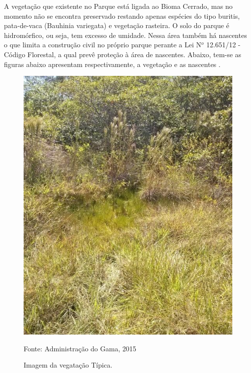A vegeta\c{c}\~ao que existente no Parque est\'a ligada ao Bioma Cerrado, mas no momento n\~ao se encontra preservado restando apenas esp\'ecies do tipo buritis, pata-de-vaca (Bauhinia variegata) e vegeta\c{c}\~ao rasteira.  O solo do parque \'e hidrom\'orfico, ou seja, tem excesso de umidade. Nessa \'area tamb\'em h\'a nascentes o que limita a constru\c{c}\~ao civil no pr\'oprio parque perante a Lei N$^{o}$ 12.651/12 - C\'odigo Florestal, a qual prev\^e prote\c{c}\~ao \`a \'area de nascentes. Abaixo, tem-se as figuras abaixo apresentam respectivamente, a vegeta\c{c}\~ao e as nascentes \cite{COEX}.

\begin{figure}[H]
	\centering
	\label{Imagem do Parque Vivencial do Gama}
		\includegraphics[keepaspectratio=true,scale=0.4]{introducao/VegatacaoTipica.jpg}
	\caption{Imagem da vegata\c{c}\~ao T\'ipica.}
	\small{Fonte: Administra\c{c}\~ao do Gama, 2015}
\end{figure}

